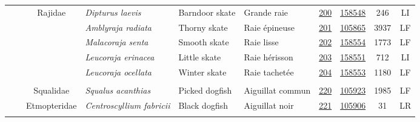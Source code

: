 \documentclass[12pt]{article}\usepackage[]{graphicx}\usepackage[]{color}
\begin{document}
\begin{landscape}
\begin{longtable}[t]{ccc>{\centering\arraybackslash}p{3cm}>{\centering\arraybackslash}p{3cm}>{\centering\arraybackslash}p{3cm}>{}c>{}ccc}
\hspace{1em}\hspace{1em} &  & Rajidae & \em{Dipturus laevis} & Barndoor skate & Grande raie & \href{#sec:200}{200} & \href{http://www.marinespecies.org/aphia.php?p=taxdetails&id=158548}{158548} & 246 & LI\\
\nopagebreak
\hspace{1em}\hspace{1em} &  &  & \em{Amblyraja radiata} & Thorny skate & Raie épineuse & \href{#sec:201}{201} & \href{http://www.marinespecies.org/aphia.php?p=taxdetails&id=105865}{105865} & 3937 & LF\\
\nopagebreak
\hspace{1em}\hspace{1em} &  &  & \em{Malacoraja senta} & Smooth skate & Raie lisse & \href{#sec:202}{202} & \href{http://www.marinespecies.org/aphia.php?p=taxdetails&id=158554}{158554} & 1773 & LF\\
\nopagebreak
\hspace{1em}\hspace{1em} &  &  & \em{Leucoraja erinacea} & Little skate & Raie hérisson & \href{#sec:203}{203} & \href{http://www.marinespecies.org/aphia.php?p=taxdetails&id=158551}{158551} & 712 & LI\\
\nopagebreak
\hspace{1em}\hspace{1em} &  &  & \em{Leucoraja ocellata} & Winter skate & Raie tachetée & \href{#sec:204}{204} & \href{http://www.marinespecies.org/aphia.php?p=taxdetails&id=158553}{158553} & 1180 & LF\\
\nopagebreak
\addlinespace[0.3em]
\\
\hspace{1em}\hspace{1em} &  & Squalidae & \em{Squalus acanthias} & Picked dogfish & Aiguillat commun & \href{#sec:220}{220} & \href{http://www.marinespecies.org/aphia.php?p=taxdetails&id=105923}{105923} & 1985 & LF\\
\nopagebreak
\hspace{1em}\hspace{1em} &  & Etmopteridae & \em{Centroscyllium fabricii} & Black dogfish & Aiguillat noir & \href{#sec:221}{221} & \href{http://www.marinespecies.org/aphia.php?p=taxdetails&id=105906}{105906} & 31 & LR\\
\pagebreak[0]
\addlinespace[0.3em]

\end{longtable}
\end{landscape}
\end{document}
